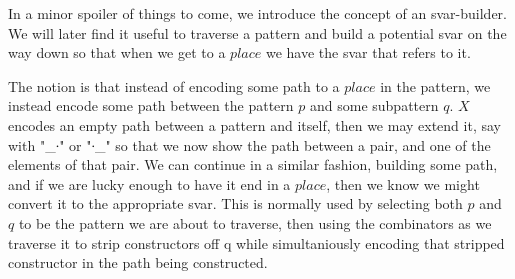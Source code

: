 In a minor spoiler of things to come, we introduce the concept of an
svar-builder. We will later find it useful to traverse a pattern and build a
potential svar on the way down so that when we get to a $place$ we have the svar
that refers to it.

The notion is that instead of encoding some path to a $place$ in the pattern,
we instead encode some path between the pattern $p$ and some subpattern $q$. 
$X$ encodes an empty path between a pattern and itself, then we
may extend it, say with "\_∙" or "∙\_" so that we now show the path between
a pair, and one of the elements of that pair. We can continue in a similar fashion,
building some path, and if we are lucky enough to have it end in a $place$, then
we know we might convert it to the appropriate svar. This is normally used by
selecting both $p$ and $q$ to be the pattern we are about to traverse, then 
using the combinators as we traverse it to strip constructors off q while
simultaniously encoding that stripped constructor in the path being constructed.


